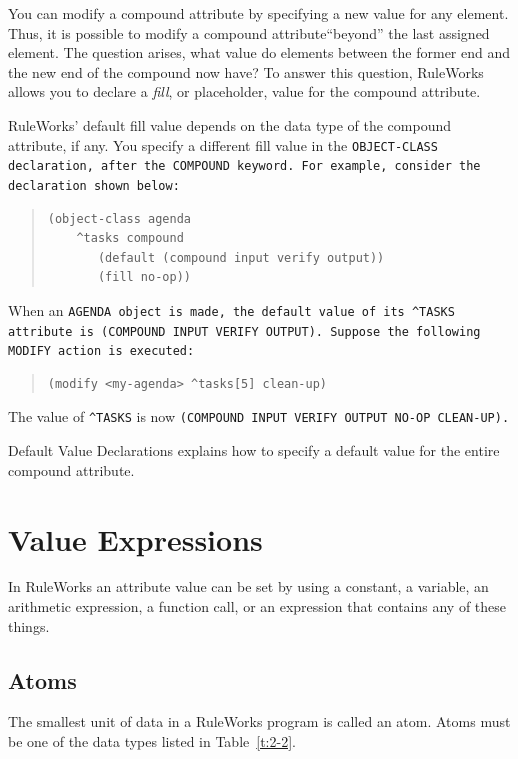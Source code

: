 You can modify a compound attribute by specifying a new value for any
element. Thus, it is possible to modify a compound attribute``beyond''
the last assigned element. The question arises, what value do elements
between the former end and the new end of the compound now have? To
answer this question, RuleWorks allows you to declare a \emph{fill},
or placeholder, value for the compound attribute.

RuleWorks' default fill value depends on the data type of the compound
attribute, if any. You specify a different fill value in the
\tt{OBJECT-CLASS} declaration, after the \tt{COMPOUND} keyword. For
example, consider the declaration shown below:

\begin{quote}
\begin{verbatim}
(object-class agenda
    ^tasks compound
       (default (compound input verify output))
       (fill no-op))
\end{verbatim}
\end{quote}

When an \tt{AGENDA} object is made, the default value of its
\verb|^TASKS| attribute is \tt{(COMPOUND INPUT VERIFY
  OUTPUT)}. Suppose the following \tt{MODIFY} action is executed:

\begin{quote}
\begin{verbatim}
(modify <my-agenda> ^tasks[5] clean-up)
\end{verbatim}
\end{quote}

The value of \verb|^TASKS| is now \tt{(COMPOUND INPUT VERIFY OUTPUT
  NO-OP CLEAN-UP)}.

Default Value Declarations explains how to specify a default value for
the entire compound attribute.

\section{Value Expressions}

In RuleWorks an attribute value can be set by using a constant, a
variable, an arithmetic expression, a function call, or an expression
that contains any of these things.

\subsection{Atoms}

The smallest unit of data in a RuleWorks program is called an
atom. Atoms must be one of the data types listed in Table~\ref{t:2-2}.

